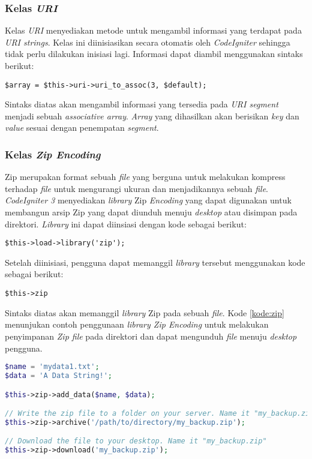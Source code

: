 \subsubsection{Kelas \textit{URI}}
Kelas \textit{URI} menyediakan metode untuk mengambil informasi yang terdapat pada \textit{URI strings}. Kelas ini diinisiasikan secara otomatis oleh \textit{CodeIgniter} sehingga tidak perlu dilakukan inisiasi lagi. Informasi dapat diambil menggunakan sintaks berikut:
\begin{center}
	\verb|$array = $this->uri->uri_to_assoc(3, $default);|
\end{center}
Sintaks diatas akan mengambil informasi yang tersedia pada \textit{URI segment} menjadi sebuah \textit{associative array}. \textit{Array} yang dihasilkan akan berisikan \textit{key} dan \textit{value} sesuai dengan penempatan \textit{segment}.

\subsubsection{Kelas \textit{Zip Encoding}}
Zip merupakan format sebuah \textit{file} yang berguna untuk melakukan kompress terhadap \textit{file} untuk mengurangi ukuran dan menjadikannya sebuah \textit{file}. \textit{CodeIgniter 3} menyediakan \textit{library} Zip \textit{Encoding} yang dapat digunakan untuk membangun arsip Zip yang dapat diunduh menuju \textit{desktop} atau disimpan pada direktori. \textit{Library} ini dapat diinsiasi dengan kode sebagai berikut:

\begin{center}
\verb|$this->load->library('zip');|
\end{center}

Setelah diinisiasi, pengguna dapat memanggil \textit{library} tersebut menggunakan kode sebagai berikut:

\begin{center}
\verb|$this->zip|
\end{center}

Sintaks diatas akan memanggil \textit{library} Zip pada sebuah \textit{file}. Kode \ref{kode:zip} menunjukan contoh penggunaan \textit{library Zip Encoding} untuk melakukan penyimpanan \textit{Zip file} pada direktori dan dapat mengunduh \textit{file} menuju \textit{desktop} pengguna.

\begin{lstlisting}[language=PHP, caption=Contoh penggunaan \textit{library Zip Encoding}, label=kode:zip]
$name = 'mydata1.txt';
$data = 'A Data String!';

$this->zip->add_data($name, $data);

// Write the zip file to a folder on your server. Name it "my_backup.zip"
$this->zip->archive('/path/to/directory/my_backup.zip');

// Download the file to your desktop. Name it "my_backup.zip"
$this->zip->download('my_backup.zip');
\end{lstlisting}

